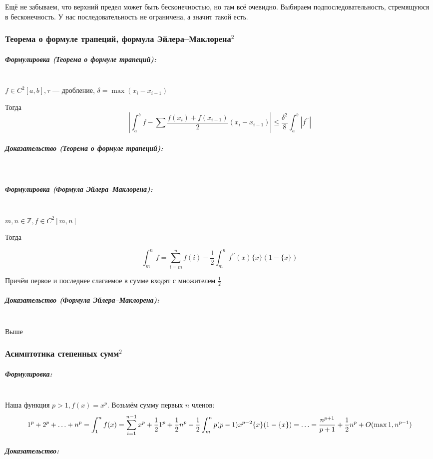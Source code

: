 \documentclass{article}
\let\vanillasubparagraph\subparagraph
\renewcommand{\subparagraph}[1]{\vanillasubparagraph{#1}\mbox{}\\}
\begin{document}
Ещё не забываем, что верхний предел может быть бесконечностью, но там всё очевидно. Выбираем подпоследовательность, стремящуюся в бесконечность. У нас последовательность не ограничена, а значит такой есть.

\subsubsection{Теорема о формуле трапеций, формула Эйлера--Маклорена\texorpdfstring{$^2$}{}}

\subparagraph{Формулировка (Теорема о формуле трапеций):}

$f \in C^2[a, b], \tau$ --- дробление, $\delta = \max(x_i - x_{i - 1})$

Тогда
\[\left|\int_a^b{f} - \sum{\frac{f(x_i) + f(x_{i - 1})}{2}(x_i - x_{i - 1})}\right| \le \frac{\delta^2}{8}\int_a^b{\left|f^{\prime\prime}\right|}\]

\subparagraph{Доказательство (Теорема о формуле трапеций):}



\subparagraph{Формулировка (Формула Эйлера--Маклорена):}

$m, n \in \mathbb{Z}, f \in C^2[m, n]$

Тогда 

\[\int_m^nf = \sum_{i = m}^n{f(i)} - \frac{1}{2}\int_m^n{f^{\prime\prime}(x)\{x\}(1 - \{x\})}\]

Причём первое и последнее слагаемое в сумме входят с множителем $\frac{1}{2}$

\subparagraph{Доказательство (Формула Эйлера--Маклорена):}

Выше

\subsubsection{Асимптотика степенных сумм\texorpdfstring{$^2$}{}}
\subparagraph{Формулировка:}

Наша функция $p > 1, f(x) = x^p$. Возьмём сумму первых $n$ членов:
\[1^p + 2^p + \ldots + n^p = \int_1^n{f(x)} = \sum_{i = 1}^{n - 1}{x^p} + \frac{1}{2}1^p + \frac{1}{2}n^p - \frac{1}{2}\int_m^n{p(p - 1)x^{p - 2}\{x\}(1 - \{x\})} \\= \ldots = \frac{n^{p + 1}}{p + 1} + \frac{1}{2}n^p + O(\max{1, n^{p - 1}})\]

\subparagraph{Доказательство:}


\end{document}
